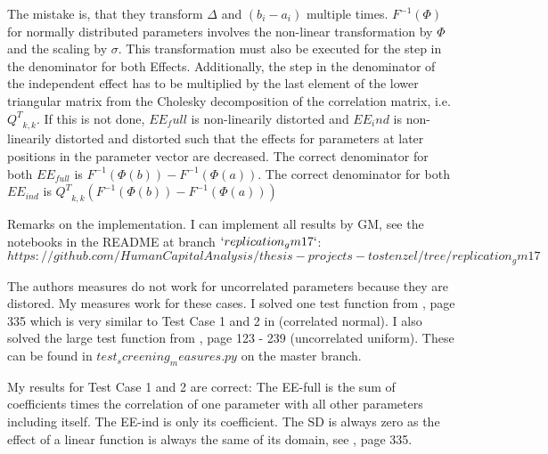 \documentclass[a4paper,12pt]{article}
\begin{document}
{\color{red}
The mistake is, that they transform $\Delta$ and $(b_i - a_i)$ multiple times. $F^{-1}(\Phi)$ for normally distributed parameters involves the non-linear transformation by $\Phi$ and the scaling by $\sigma$. This transformation must also be executed for the step in the denominator for both Effects. Additionally, the step in the denominator of the independent effect has to be multiplied by the last element of the lower triangular matrix from the Cholesky decomposition of the correlation matrix, i.e. ${Q^T}_{k,k}$. If this is not done, $EE_full$ is non-linearily distorted and $EE_ind$ is non-linearily distorted and distorted such that the effects for parameters at later positions in the parameter vector are decreased.
The correct denominator for both $EE_{full}$ is $F^{-1}(\Phi(b)) - F^{-1}(\Phi(a))$. The correct denominator for both $EE_{ind}$ is ${Q^T}_{k,k}(F^{-1}(\Phi(b)) - F^{-1}(\Phi(a)))$

Remarks on the implementation. I can implement all results by GM, see the notebooks in the README at branch $`replication_gm17`$: $https://github.com/HumanCapitalAnalysis/thesis-projects-tostenzel/tree/replication_gm17$

The authors measures do not work for uncorrelated parameters because they are distored.
My measures work for these cases. I solved one test function from \cite{Smith.2014}, page 335 which is very similar to Test Case 1 and 2 in \cite{ge2017extending} (correlated normal). I also solved the large test function from \cite{Saltelli.2008}, page 123 - 239 (uncorrelated uniform). These can be found in $test_screening_measures.py$ on the master branch.

My results for Test Case 1 and 2 are correct: The EE-full is the sum of coefficients times the correlation of one parameter with all other parameters including itself. The EE-ind is only its coefficient. The SD is always zero as the effect of a linear function is always the same of its domain, see \cite{Smith.2014}, page 335.


}







\newpage

\end{document}
